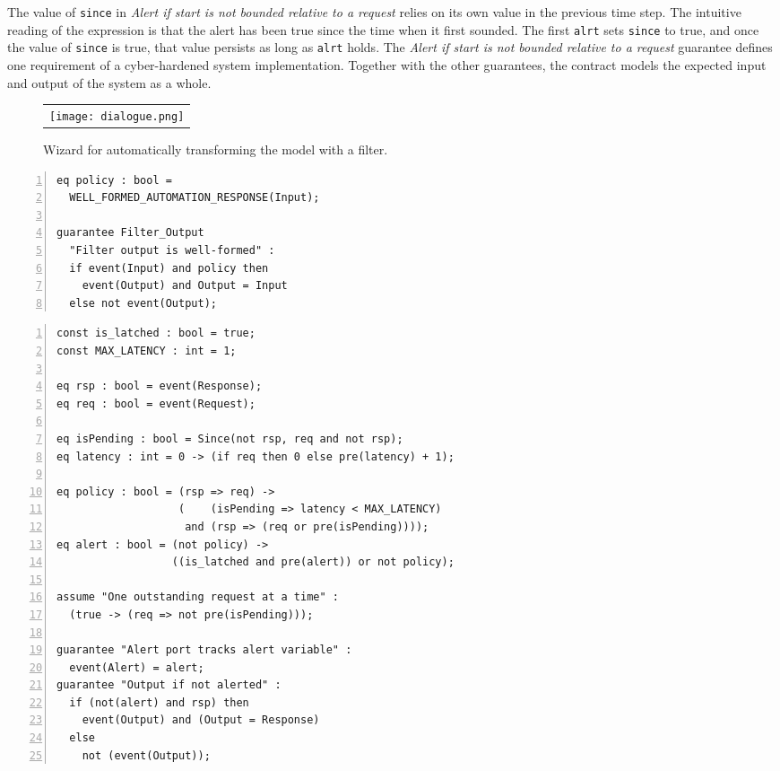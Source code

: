 The value of \texttt{since} in \emph{Alert if start is not bounded relative to a request} relies on its own value in the previous time step.
The intuitive reading of the expression is that the alert has been true since the time when it first sounded.
The first \texttt{alrt} sets \texttt{since} to true, and once the value of \texttt{since} is true, that value persists as long as \texttt{alrt} holds.
The \emph{Alert if start is not bounded relative to a request} guarantee defines one requirement of a cyber-hardened system implementation.
Together with the other guarantees, the contract models the expected input and output of the system as a whole.

\begin{figure}
  \begin{center}
    \begin{tabular}{c}
      \texttt{[image: dialogue.png]}
    \end{tabular}
  \end{center}
  \caption{Wizard for automatically transforming the model with a filter.}
  \label{fig:dialogue}
\end{figure}

\newsavebox{\flt}
\begin{lrbox}{\flt}
\begin{lstlisting}[style=agree,numbers=left]
eq policy : bool = 
  WELL_FORMED_AUTOMATION_RESPONSE(Input);

guarantee Filter_Output
  "Filter output is well-formed" :
  if event(Input) and policy then 
    event(Output) and Output = Input
  else not event(Output);
\end{lstlisting}
\end{lrbox}

\newsavebox{\mntr}
\begin{lrbox}{\mntr}
\begin{lstlisting}[style=agree,numbers=left]
const is_latched : bool = true;
const MAX_LATENCY : int = 1;
    
eq rsp : bool = event(Response);
eq req : bool = event(Request);

eq isPending : bool = Since(not rsp, req and not rsp);
eq latency : int = 0 -> (if req then 0 else pre(latency) + 1);

eq policy : bool = (rsp => req) ->
                   (    (isPending => latency < MAX_LATENCY)   
                    and (rsp => (req or pre(isPending))));
eq alert : bool = (not policy) -> 
                  ((is_latched and pre(alert)) or not policy);

assume "One outstanding request at a time" :
  (true -> (req => not pre(isPending))); 
                          
guarantee "Alert port tracks alert variable" :
  event(Alert) = alert;
guarantee "Output if not alerted" :
  if (not(alert) and rsp) then
    event(Output) and (Output = Response)
  else
    not (event(Output));    
\end{lstlisting}
\end{lrbox}

